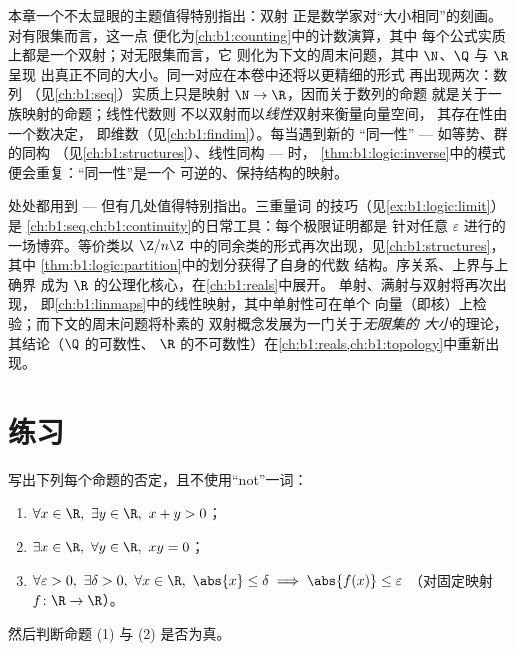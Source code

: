 \begin{remark}[插曲：以双射刻画大小]\label{rem:b1:logic:interlude}
本章一个不太显眼的主题值得特别指出：双射
正是数学家对“大小相同”的刻画。对有限集而言，这一点
便化为\cref{ch:b1:counting}中的计数演算，其中
每个公式实质上都是一个双射；对无限集而言，它
则化为下文的周末问题，其中 $\N$、$\Q$ 与 $\R$ 呈现
出真正不同的大小。同一对应在本卷中还将以更精细的形式
再出现两次：数列
（见\cref{ch:b1:seq}）实质上只是映射 $\N \to \R$，因而关于数列的命题
就是关于一族映射的命题；线性代数则
不以双射而以\emph{线性}双射来衡量向量空间，
其存在性由一个数决定，
即维数（见\cref{ch:b1:findim}）。每当遇到新的
“同一性” --- 如等势、群的同构
（见\cref{ch:b1:structures}）、线性同构 --- 时，
\cref{thm:b1:logic:inverse}中的模式便会重复：“同一性”是一个
可逆的、保持结构的映射。
\end{remark}

\begin{remark}[本章的应用]\label{rem:b1:logic:whereused}
处处都用到 --- 但有几处值得特别指出。三重量词
的技巧（见\cref{ex:b1:logic:limit}）是
\cref{ch:b1:seq,ch:b1:continuity}的日常工具：每个极限证明都是
针对任意 $\varepsilon$ 进行的一场博弈。等价类以
$\Z/n\Z$ 中的同余类的形式再次出现，见\cref{ch:b1:structures}，其中
\cref{thm:b1:logic:partition}中的划分获得了自身的代数
结构。序关系、上界与上确界
成为 $\R$ 的公理化核心，在\cref{ch:b1:reals}中展开。
单射、满射与双射将再次出现，
即\cref{ch:b1:linmaps}中的线性映射，其中单射性可在单个
向量（即核）上检验；而下文的周末问题将朴素的
双射概念发展为一门关于\emph{无限集的
大小}的理论，其结论（$\Q$ 的可数性、
$\R$ 的不可数性）在\cref{ch:b1:reals,ch:b1:topology}中重新出现。
\end{remark}

\section{练习}

\begin{exercise}[$\star$]\label{exo:b1:logic:1}
写出下列每个命题的否定，且不使用“not”一词：
\begin{enumerate}
  \item $\forall x \in \R,\ \exists y \in \R,\ x + y > 0$；
  \item $\exists x \in \R,\ \forall y \in \R,\ xy = 0$；
  \item $\forall \varepsilon > 0,\ \exists \delta > 0,\ \forall x \in
        \R,\ \abs{x} \leq \delta \implies \abs{f(x)} \leq \varepsilon$
        （对固定映射 $f \colon \R \to \R$）。
\end{enumerate}
然后判断命题 (1) 与 (2) 是否为真。
\end{exercise}

